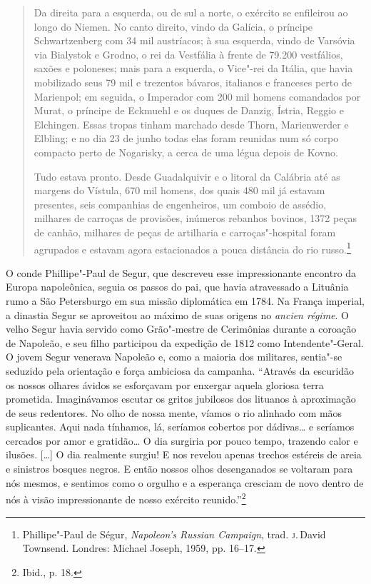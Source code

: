 \begin{quote}
Da direita para a esquerda, ou de sul a norte, o exército se enfileirou
ao longo do Niemen. No canto direito, vindo da Galícia, o príncipe
Schwartzenberg com 34 mil austríacos; à sua esquerda, vindo
de Varsóvia via Bialystok e Grodno, o rei da Vestfália à frente de
79.200 vestfálios, saxões e poloneses; mais para
a esquerda, o Vice"-rei da Itália, que havia mobilizado seus 79 mil e trezentos bávaros, italianos e franceses perto de Marienpol;
em seguida, o Imperador com 200 mil homens comandados por Murat, o
príncipe de Eckmuehl e os duques de Danzig, Ístria, Reggio e Elchingen.
Essas tropas tinham marchado desde Thorn, Marienwerder e Elbling; e no
dia 23 de junho todas elas foram reunidas num só corpo compacto perto de
Nogarisky, a cerca de uma légua depois de Kovno.

Tudo estava pronto. Desde Guadalquivir e o litoral da Calábria até as
margens do Vístula, 670 mil homens, dos quais
480 mil já estavam presentes, seis companhias de
engenheiros, um comboio de assédio, milhares de carroças de provisões,
inúmeros rebanhos bovinos, 1372 peças de
canhão, milhares de peças de artilharia e carroças"-hospital foram
agrupados e estavam agora estacionados a pouca distância do rio
russo.\footnote{Phillipe"-Paul de Ségur, \textit{Napoleon's Russian Campaign}, trad. \textsc{j}.\,David Townsend. Londres: Michael Joseph, 1959, pp. 16--17.} \end{quote}

O conde Phillipe"-Paul de Segur, que descreveu esse impressionante
encontro da Europa napoleônica, seguia os passos do pai, que havia
atravessado a Lituânia rumo a São Petersburgo em sua missão diplomática
em 1784. Na França imperial, a dinastia Segur se aproveitou ao máximo de
suas origens no \textit{ancien régime}. O velho Segur havia servido como
Grão"-mestre de Cerimônias durante a coroação de Napoleão, e seu filho
participou da expedição de 1812 como Intendente"-Geral. O jovem Segur
venerava Napoleão e, como a maioria dos militares, sentia"-se seduzido
pela orientação e força ambiciosa da campanha. ``Através da escuridão os
nossos olhares ávidos se esforçavam por enxergar aquela gloriosa terra
prometida. Imaginávamos escutar os gritos jubilosos dos lituanos à
aproximação de seus redentores. No olho de nossa mente, víamos o rio
alinhado com mãos suplicantes. Aqui nada tínhamos, lá, seríamos cobertos
por dádivas\ldots{} e seríamos cercados por amor e gratidão\ldots{} O
dia surgiria por pouco tempo, trazendo calor e ilusões. [\ldots{}] O dia
realmente surgiu! E nos revelou apenas trechos estéreis de areia e
sinistros bosques negros. E então nossos olhos desenganados se voltaram
para nós mesmos, e sentimos como o orgulho e a esperança cresciam de
novo dentro de nós à visão impressionante de nosso exército
reunido.''\footnote{Ibid., p. 18.}

